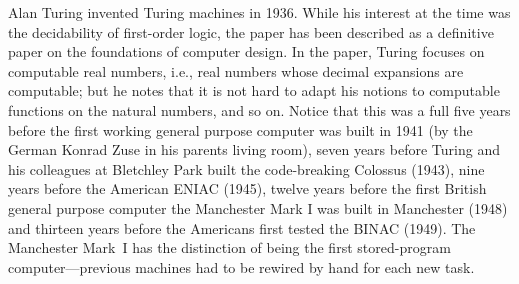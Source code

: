 \documentclass[../../../include/open-logic-section]{subfiles}
\begin{document}
\begin{history}
Alan Turing invented Turing machines in 1936. While his interest at
the time was the decidability of first-order logic, the paper has been
described as a definitive paper on the foundations of computer
design. In the paper, Turing focuses on computable real numbers, i.e.,
real numbers whose decimal expansions are computable; but he notes
that it is not hard to adapt his notions to computable functions on
the natural numbers, and so on.  Notice that this was a full five
years before the first working general purpose computer was built in
1941 (by the German Konrad Zuse in his parents living room), seven
years before Turing and his colleagues at Bletchley Park built the
code-breaking Colossus (1943), nine years before the American ENIAC
(1945), twelve years before the first British general purpose computer
the Manchester Mark I was built in Manchester (1948) and thirteen
years before the Americans first tested the BINAC (1949). The
Manchester Mark~I has the distinction of being the first
stored-program computer---previous machines had to be rewired by hand
for each new task.
\end{history}
\end{document}

